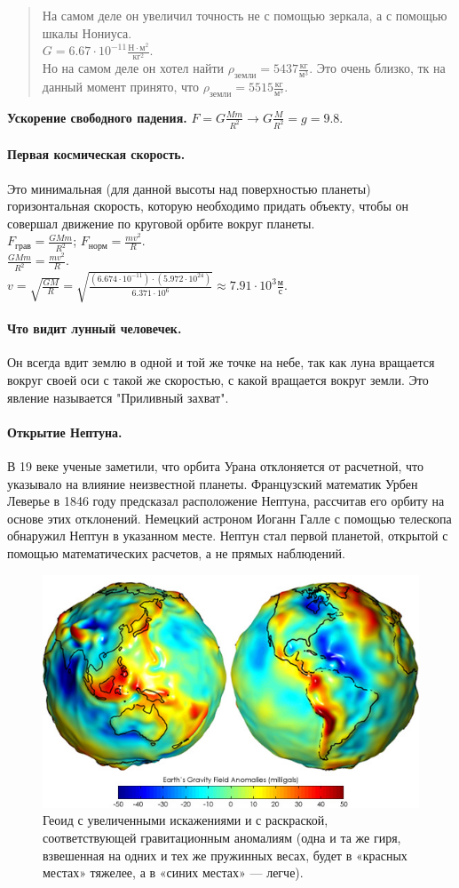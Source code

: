 \documentclass{article}
\begin{document}
	\begin{quote}
		На самом деле он увеличил точность не с помощью зеркала, а с помощью шкалы Нониуса. \\
		$G = 6.67 \cdot 10^{-11} \frac{\text{Н} \cdot \text{м}^2}{\text{кг}^2}$. \\
		Но на самом деле он хотел найти $\rho_{\text{земли}} = 5437 \frac{\text{кг}}{\text{м}^3}$. Это очень близко, тк на данный момент принято, что $\rho_{\text{земли}} = 5515 \frac{\text{кг}}{\text{м}^3}$.
	\end{quote}
	\textbf{Ускорение свободного падения.} $F = G \frac{Mm}{R^2} \rightarrow G \frac{M}{R^2} = g = 9.8$.
	\paragraph{Первая космическая скорость.}
	Это минимальная (для данной высоты над поверхностью планеты) горизонтальная скорость, которую необходимо придать объекту, чтобы он совершал движение по круговой орбите вокруг планеты. \\
	$F_{\text{грав}} = \frac{GMm}{R^2}$; $F_{\text{норм}} = \frac{mv^2}{R}$. \\
	$\frac{GMm}{R^2} = \frac{mv^2}{R}$. \\
	$v = \sqrt{\frac{GM}{R}} = \sqrt{\frac{(6.674 \cdot 10^{-11}) \cdot (5.972 \cdot 10^{24})}{6.371 \cdot 10^6}} \approx 7.91 \cdot 10^3 \frac{\text{м}}{\text{с}}$.
	\paragraph{Что видит лунный человечек.} Он всегда вдит землю в одной и той же точке на небе, так как луна вращается вокруг своей оси с такой же скоростью, с какой вращается вокруг земли. Это явление называется "Приливный захват".
	\paragraph{Открытие Нептуна.} В 19 веке ученые заметили, что орбита Урана отклоняется от расчетной, что указывало на влияние неизвестной планеты. Французский математик Урбен Леверье в 1846 году предсказал расположение Нептуна, рассчитав его орбиту на основе этих отклонений. Немецкий астроном Иоганн Галле с помощью телескопа обнаружил Нептун в указанном месте. Нептун стал первой планетой, открытой с помощью математических расчетов, а не прямых наблюдений.
	\begin{figure}[H]
		\includegraphics[height=0.25\textwidth]{extra-materials/Геоид}
		\caption{Геоид с увеличенными искажениями и с раскраской, соответствующей гравитационным аномалиям (одна и та же гиря, взвешенная на одних и тех же пружинных весах, будет в «красных местах» тяжелее, а в «синих местах» — легче).}
	\end{figure}
\end{document}
